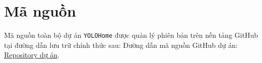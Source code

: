 \documentclass[a4paper,twoside]{article}
\theoremstyle{definition}
\newcommand{\blankpage}{\newpage \null \thispagestyle{empty} \newpage}
\begin{document}

\newpage














\section*{Mã nguồn}
Mã nguồn toàn bộ dự án \texttt{YOLOHome} được quản lý phiên bản trên nền tảng GitHub tại đường dẫn lưu trữ chính thức sau:
Đường dẫn mã nguồn GitHub dự án: \href{https://github.com/AiemHao/YOLOHome.git}{Repository dự án}.
\end{document}
